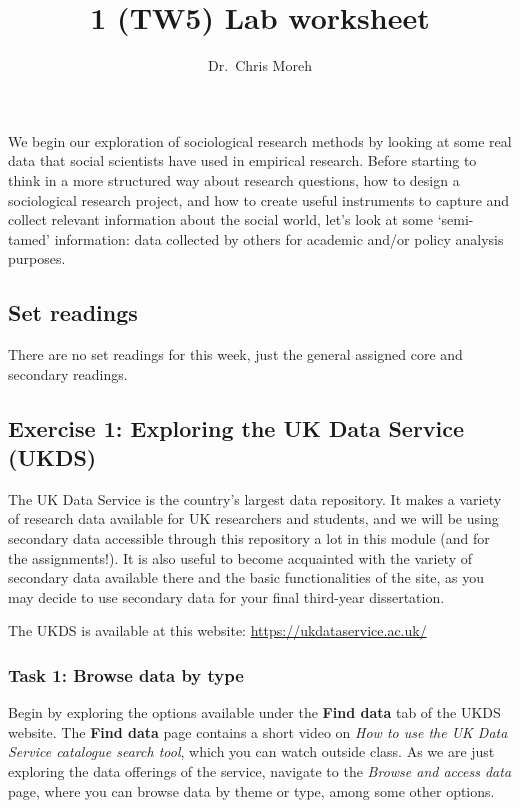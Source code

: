 \documentclass[
]{article}
\title{1 (TW5) Lab worksheet}
\author{Dr.~Chris Moreh}
\date{}
\begin{document}
\maketitle

We begin our exploration of sociological research methods by looking at
some real data that social scientists have used in empirical research.
Before starting to think in a more structured way about research
questions, how to design a sociological research project, and how to
create useful instruments to capture and collect relevant information
about the social world, let's look at some `semi-tamed' information:
data collected by others for academic and/or policy analysis purposes.

\hypertarget{set-readings}{%
\subsection{Set readings}\label{set-readings}}

There are no set readings for this week, just the general assigned core
and secondary readings.

\hypertarget{exercise-1-exploring-the-uk-data-service-ukds}{%
\subsection{Exercise 1: Exploring the UK Data Service
(UKDS)}\label{exercise-1-exploring-the-uk-data-service-ukds}}

The UK Data Service is the country's largest data repository. It makes a
variety of research data available for UK researchers and students, and
we will be using secondary data accessible through this repository a lot
in this module (and for the assignments!). It is also useful to become
acquainted with the variety of secondary data available there and the
basic functionalities of the site, as you may decide to use secondary
data for your final third-year dissertation.

The UKDS is available at this website:
\url{https://ukdataservice.ac.uk/}

\hypertarget{task-1-browse-data-by-type}{%
\subsubsection{Task 1: Browse data by
type}\label{task-1-browse-data-by-type}}

Begin by exploring the options available under the \textbf{Find data}
tab of the UKDS website. The \textbf{Find data} page contains a short
video on \emph{How to use the UK Data Service catalogue search tool},
which you can watch outside class. As we are just exploring the data
offerings of the service, navigate to the \emph{Browse and access data}
page, where you can browse data by theme or type, among some other
options.
\end{document}
